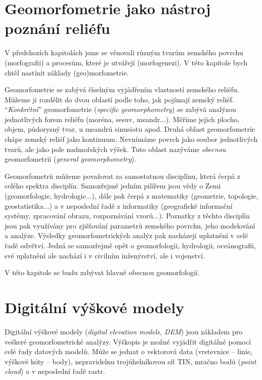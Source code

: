 \section{Geomorfometrie jako nástroj poznání reliéfu}
V předchozích kapitolách jsme se věnovali různým tvarům zemského povrchu (morfografii) a procesům, které je utvářejí (morfogenezi). V této kapitole bych chtěl nastínit základy (geo)morfometrie. 

Geomorfometrie se zabývá číselným vyjádřením vlastností zemského reliéfu. Můžeme ji rozdělit do dvou oblastí podle toho, jak pojímají zemský reliéf. \enquote{\emph{Konkrétní}} geomorfometrie (\textit{specific geomorphometry}) se zabývá analýzou jednotlivých forem reliéfu (moréna, sesuv, meandr...). Měříme jejich plocho, objem, půdorysný tvar, u meandrů sinusiotu apod. Druhá oblast geomorfometrie chápe zemský reliéf jako kontinuum. Nevnímáme povrch jako soubor jednotlivých tvarů, ale jako pole nadmořských výšek. Tuto oblast nazýváme \emph{obecnou} geomorfometrií (\textit{general geomorphometry}).

Geomorfometrii můžeme považovat za samostatnou disciplínu, která čerpá z celého spektra disciplín. Samozřejmě jedním pilířem jsou vědy o Zemi (geomorfologie, hydrologie...), dále pak čerpá z matematiky (geometrie, topologie, geostatistika...) a v neposlední řadě z informatiky (geografické informační systémy, zpracování obrazu, rozpoznávání vzorů...). Poznatky z těchto disciplín jsou pak využívány pro zjišťování parametrů zemského povrchu, jeho modelování a analýze. Výsledky geomorfometrických analýz pak nacházejí uplatnění v celé řadě odvětví. Jedná se samozřejmě opět o geomorfologii, hydrologii, oceánografii, své uplatnění ale nachází i v civilním inženýrství, ale i vojenství. 

V této kapitole se budu zabývat hlavně obecnou geomorfologií.

\section{Digitální výškové modely}
Digitální výškové modely (\textit{digital elevation models, DEM}) jsou základem pro veškeré geomorfometrické analýzy. Výškopis je možné vyjádřit digitálně pomocí celé řady datových modelů. Může se jednat o vektorová data (vrstevnice -- linie, výškové kóty -- body), nepravidelnu trojúhelníkovou síť TIN, mračno bodů (\textit{point cloud}) a v neposlední řadě rastr. %

